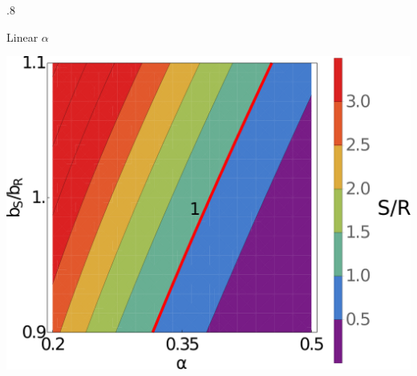 \documentclass[final]{beamer}
\newlength{\onecolwid}
\newlength{\figwid}
\begin{document}
\begin{frame}[t]
\begin{block}
\begin{columns}[t]
\begin{column}{.8\onecolwid}
  \begin{block}{Linear $\alpha$}
    \begin{center}
      \includegraphics[width=\figwid]{../dev/graphics/poster/linear_contour.pdf}
      \vspace{1.5ex}


\end{center}
\end{block}
\end{column}
\end{columns}
\end{block}
\end{frame}
\end{document}
